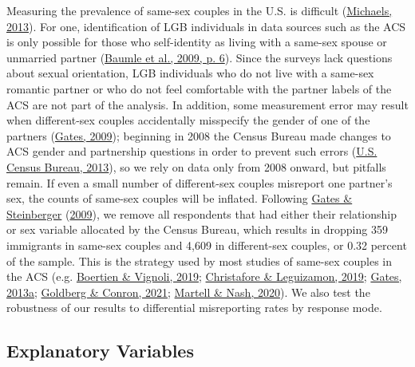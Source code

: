 \documentclass[
  11pt,
]{article}
\begin{document}
Measuring the prevalence of same-sex couples in the U.S. is difficult (\protect\hyperlink{ref-michaels_2013}{Michaels, 2013}). For one, identification of LGB individuals in data sources such as the ACS is only possible for those who self-identity as living with a same-sex spouse or unmarried partner (\protect\hyperlink{ref-baumle_2009}{Baumle et al., 2009, p. 6}). Since the surveys lack questions about sexual orientation, LGB individuals who do not live with a same-sex romantic partner or who do not feel comfortable with the partner labels of the ACS are not part of the analysis. In addition, some measurement error may result when different-sex couples accidentally misspecify the gender of one of the partners (\protect\hyperlink{ref-gates_2009a}{Gates, 2009}); beginning in 2008 the Census Bureau made changes to ACS gender and partnership questions in order to prevent such errors (\protect\hyperlink{ref-u.s.censusbureau_2013}{U.S. Census Bureau, 2013}), so we rely on data only from 2008 onward, but pitfalls remain. If even a small number of different-sex couples misreport one partner's sex, the counts of same-sex couples will be inflated. Following \protect\hyperlink{ref-gates_2009}{Gates \& Steinberger} (\protect\hyperlink{ref-gates_2009}{2009}), we remove all respondents that had either their relationship or sex variable allocated by the Census Bureau, which results in dropping 359 immigrants in same-sex couples and 4,609 in different-sex couples, or 0.32 percent of the sample. This is the strategy used by most studies of same-sex couples in the ACS (e.g. \protect\hyperlink{ref-boertien_2019}{Boertien \& Vignoli, 2019}; \protect\hyperlink{ref-christafore_2019}{Christafore \& Leguizamon, 2019}; \protect\hyperlink{ref-gates_2013}{Gates, 2013a}; \protect\hyperlink{ref-goldberg_2021}{Goldberg \& Conron, 2021}; \protect\hyperlink{ref-martell_2020}{Martell \& Nash, 2020}). We also test the robustness of our results to differential misreporting rates by response mode.

\hypertarget{explanatory-variables}{%
\subsection{Explanatory Variables}\label{explanatory-variables}}
\end{document}
